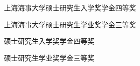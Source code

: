 \begin{awards}
	\item 上海海事大学硕士研究生入学奖学金四等奖
	\item 上海海事大学硕士研究生学业奖学金三等奖
\end{awards}

\begin{awards*}
	\item 硕士研究生入学奖学金四等奖
	\item 硕士研究生学业奖学金三等奖
\end{awards*}